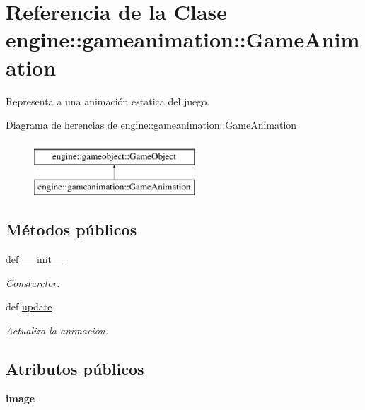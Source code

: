 \hypertarget{classengine_1_1gameanimation_1_1GameAnimation}{
\section{\-Referencia de la \-Clase engine\-:\-:gameanimation\-:\-:\-Game\-Animation}
\label{classengine_1_1gameanimation_1_1GameAnimation}
}


\-Representa a una animación estatica del juego.  


\-Diagrama de herencias de engine\-:\-:gameanimation\-:\-:\-Game\-Animation\begin{figure}[H]
\begin{center}
\leavevmode
\includegraphics[height=2.000000cm]{classengine_1_1gameanimation_1_1GameAnimation}
\end{center}
\end{figure}
\subsection*{\-Métodos públicos}
\begin{DoxyCompactItemize}
\item 
def \hyperlink{classengine_1_1gameanimation_1_1GameAnimation_a09d31c9727418153550a31bf3ef8244f}{\-\_\-\-\_\-init\-\_\-\-\_\-}
\begin{DoxyCompactList}\small\item\em \-Consturctor. \end{DoxyCompactList}\item 
\hypertarget{classengine_1_1gameanimation_1_1GameAnimation_a8c8b4e26794d99045a996c4e0f1598e2}{
def \hyperlink{classengine_1_1gameanimation_1_1GameAnimation_a8c8b4e26794d99045a996c4e0f1598e2}{update}}
\label{classengine_1_1gameanimation_1_1GameAnimation_a8c8b4e26794d99045a996c4e0f1598e2}

\begin{DoxyCompactList}\small\item\em \-Actualiza la animacion. \end{DoxyCompactList}\end{DoxyCompactItemize}
\subsection*{\-Atributos públicos}
\begin{DoxyCompactItemize}
\item 
\hypertarget{classengine_1_1gameanimation_1_1GameAnimation_a74cc9b4b3508045974933b37a3d2eefc}{
{\bfseries image}}
\label{classengine_1_1gameanimation_1_1GameAnimation_a74cc9b4b3508045974933b37a3d2eefc}

\end{DoxyCompactItemize}


